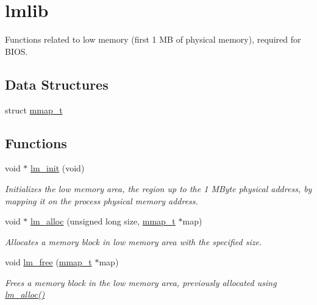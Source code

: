 \hypertarget{group__lmlib}{}\section{lmlib}
\label{group__lmlib}


Functions related to low memory (first 1 MB of physical memory), required for B\+I\+OS.  


\subsection*{Data Structures}
\begin{DoxyCompactItemize}
\item 
struct \hyperlink{structmmap__t}{mmap\+\_\+t}
\end{DoxyCompactItemize}
\subsection*{Functions}
\begin{DoxyCompactItemize}
\item 
void $\ast$ \hyperlink{group__lmlib_ga00a9c17c01e794a6bfc80fc5c6ab1ed1}{lm\+\_\+init} (void)
\begin{DoxyCompactList}\small\item\em Initializes the low memory area, the region up to the 1 M\+Byte physical address, by mapping it on the process\textquotesingle{} physical memory address. \end{DoxyCompactList}\item 
void $\ast$ \hyperlink{group__lmlib_gae45d971ce2ffcf4dc2677eba033a92cd}{lm\+\_\+alloc} (unsigned long size, \hyperlink{structmmap__t}{mmap\+\_\+t} $\ast$map)
\begin{DoxyCompactList}\small\item\em Allocates a memory block in low memory area with the specified size. \end{DoxyCompactList}\item 
void \hyperlink{group__lmlib_ga73e89d9c297b7390021fb545513579c6}{lm\+\_\+free} (\hyperlink{structmmap__t}{mmap\+\_\+t} $\ast$map)
\begin{DoxyCompactList}\small\item\em Frees a memory block in the low memory area, previously allocated using \hyperlink{group__lmlib_gae45d971ce2ffcf4dc2677eba033a92cd}{lm\+\_\+alloc()} \end{DoxyCompactList}\end{DoxyCompactItemize}
